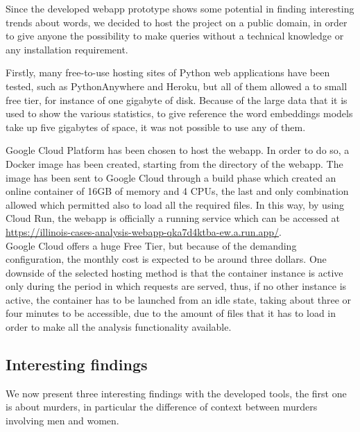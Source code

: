 Since the developed webapp prototype shows some potential in finding interesting trends about words, we 
decided to host the project on a public domain, in order to give anyone the possibility to make queries 
without a technical knowledge or any installation requirement.

Firstly, many free-to-use hosting sites of Python web applications have been tested, such as PythonAnywhere and Heroku,
but all of them allowed a to small free tier, for instance of one gigabyte of disk. 
Because of the large data that it is used to
show the various statistics, to give reference the word embeddings models take up five gigabytes of space, it was not
possible to use any of them.

Google Cloud Platform has been chosen to host the webapp. In order to do so, a Docker image has been created, starting
from the directory of the webapp. The image has been sent to Google Cloud through a build phase which created an online
container of 16GB of memory and 4 CPUs, the last and only combination allowed which permitted also to load all the
required files. In this way, by using Cloud Run, the webapp is officially a running service which can be accessed at
\url{https://illinois-cases-analysis-webapp-qka7d4ktba-ew.a.run.app/}.\\
Google Cloud offers a huge Free Tier, but because of the demanding configuration,
the monthly cost is expected to be around three dollars. One downside of the selected hosting method is that the container instance is active only during the
period in which requests are served, thus, if no other instance is active, the container has to be launched
from an idle state, taking about three or four minutes to be accessible, due to the amount of files that it
has to load in order to make all the analysis functionality available.

\subsection{Interesting findings}
We now present three interesting findings with the developed tools, the first one is about murders, in 
particular the difference of context between murders involving men and women.